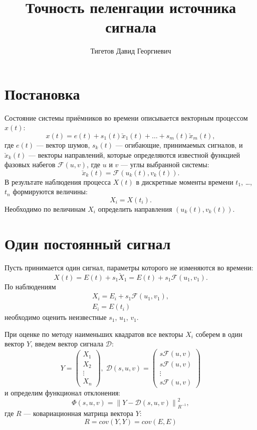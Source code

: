 \documentclass[a4paper,12pt]{article}
\newcommand{\norm}[2]{\left \| #1 \right \|_{#2}}
\newcommand{\covariance}[2]{cov \left( #1, #2 \right)}
\begin{document}
    \title{Точность пеленгации источника сигнала}
    \author{Тигетов Давид Георгиевич}
    \maketitle


    \section{Постановка}
    
    Состояние системы приёмников во времени описывается векторным процессом $x(t)$:
    \[
        x(t) = e(t) + s_1(t) \breve{x}_1(t) + \dots + s_m(t) \breve{x}_m(t) ,
    \]
    где $e(t)$ --- вектор шумов, $s_k(t)$ --- огибающие, принимаемых сигналов, и $\breve{x}_k(t)$ --- векторы направлений,
    которые определяются известной функцией фазовых набегов $\mathcal{F}(u,v)$, где $u$ и $v$ --- углы выбранной системы:
    \[
        \breve{x}_k(t) = \mathcal{F}(u_k(t), v_k(t)) .
    \]
    В результате наблюдения процесса $X(t)$ в дискретные моменты времени $t_1$, \dots, $t_n$ формируются величины:
    \[
        X_i = X(t_i) .
    \]
    Необходимо по величинам $X_i$ определить направления $(u_k(t), v_k(t))$.

    \section{Один постоянный сигнал}
    
    Пусть принимается один сигнал, параметры которого не изменяются во времени:
    \[
        X(t)
        = E(t) + s_1 \breve{X}_1
        = E(t) + s_1 \mathcal{F}(u_1, v_1) .
    \]
    По наблюдениям
    \begin{gather*}
        X_i = E_i + s_1 \mathcal{F}(u_1, v_1), \\
        E_i = E(t_i)
    \end{gather*}
    необходимо оценить неизвестные $s_1$, $u_1$, $v_1$.
    
    При оценке по методу наименьших квадратов все векторы $X_i$ соберем в один вектор $Y$, введем вектор сигнала $\mathcal{D}$:
    \[
        Y =
        \begin{pmatrix}
            X_1 \\
            X_2 \\
            \vdots \\
            X_n
        \end{pmatrix}
        , \;
        \mathcal{D}(s, u, v) =
        \begin{pmatrix}
            s \mathcal{F}(u, v) \\
            s \mathcal{F}(u, v) \\
            \vdots \\
            s \mathcal{F}(u, v)
        \end{pmatrix}
    \]
    и определим функционал отклонения:
    \[
        \Phi(s,u,v)
        = \norm{Y - \mathcal{D}(s,u,v)}{R^{-1}}^2 ,
    \]
    где $R$ --- ковариационная матрица вектора $Y$:
    \[
        R
        = \covariance{Y}{Y}
        = \covariance{E}{E}
    \]
\end{document}
